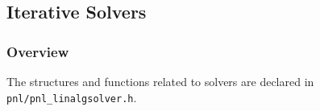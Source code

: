 





\subsection{Iterative Solvers}
\subsubsection{Overview}

The structures and functions related to solvers are declared in
\verb!pnl/pnl_linalgsolver.h!. 

